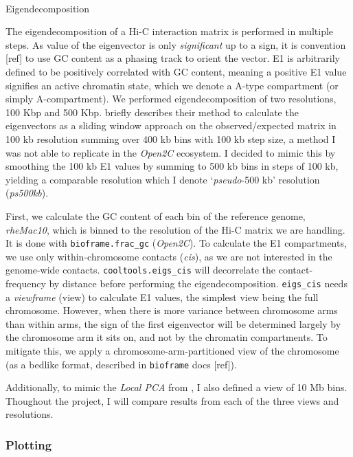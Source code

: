 \documentclass[
  11pt,
  a4paper,
]{scrbook}
\makeatletter
\let\oldparagraph\paragraph
\renewcommand{\paragraph}{
    \@ifstar
      \xxxParagraphStar
      \xxxParagraphNoStar
  }
\newcommand{\xxxParagraphStar}[1]{\oldparagraph*{#1}\mbox{}}
\newcommand{\xxxParagraphNoStar}[1]{\oldparagraph{#1}\mbox{}}
\let\oldemph\emph
\renewcommand\emph[1]{\oldemph{\color{gray}#1}}
\makeatother
\begin{document}
\paragraph{Eigendecomposition}\label{eigendecomposition}

The eigendecomposition of a Hi-C interaction matrix is performed in
multiple steps. As value of the eigenvector is only \emph{significant}
up to a sign, it is convention {[}ref{]} to use GC content as a phasing
track to orient the vector. E1 is arbitrarily defined to be positively
correlated with GC content, meaning a positive E1 value signifies an
active chromatin state, which we denote a A-type compartment (or simply
A-compartment). We performed eigendecomposition of two resolutions, 100
Kbp and 500 Kbp. \citet{wang_reprogramming_2019} briefly describes their
method to calculate the eigenvectors as a sliding window approach on the
observed/expected matrix in 100 kb resolution summing over 400 kb bins
with 100 kb step size, a method I was not able to replicate in the
\emph{Open2C} ecosystem. I decided to mimic this by smoothing the 100 kb
E1 values by summing to 500 kb bins in steps of 100 kb, yielding a
comparable resolution which I denote `\emph{pseudo}-500 kb' resolution
(\emph{ps500kb}).

First, we calculate the GC content of each bin of the reference genome,
\emph{rheMac10}, which is binned to the resolution of the Hi-C matrix we
are handling. It is done with \texttt{bioframe.frac\_gc}
(\emph{Open2C}). To calculate the E1 compartments, we use only
within-chromosome contacts (\emph{cis}), as we are not interested in the
genome-wide contacts. \texttt{cooltools.eigs\_cis} will decorrelate the
contact-frequency by distance before performing the eigendecomposition.
\texttt{eigs\_cis} needs a \emph{viewframe} (view) to calculate E1
values, the simplest view being the full chromosome. However, when there
is more variance between chromosome arms than within arms, the sign of
the first eigenvector will be determined largely by the chromosome arm
it sits on, and not by the chromatin compartments. To mitigate this, we
apply a chromosome-arm-partitioned view of the chromosome (as a bedlike
format, described in \texttt{bioframe} docs {[}ref{]}).

Additionally, to mimic the \emph{Local PCA} from
\citep{wang_reprogramming_2019}, I also defined a view of 10 Mb bins.
Thoughout the project, I will compare results from each of the three
views and resolutions.

\subsubsection{Plotting}\label{plotting}
\end{document}
